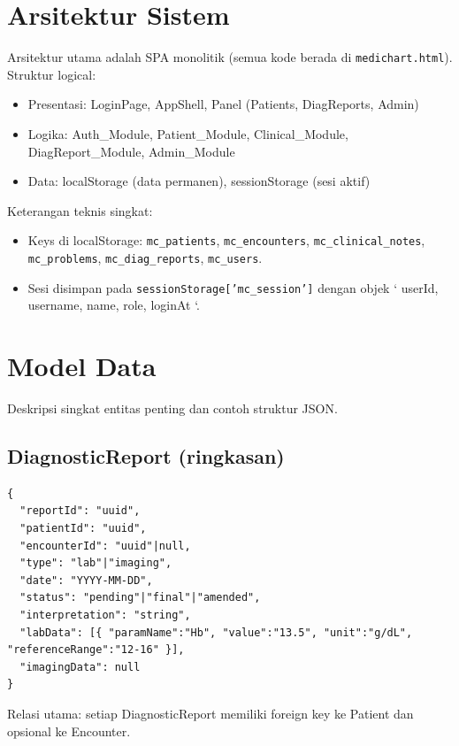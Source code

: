 \documentclass[12pt,a4paper]{article}
\begin{document}
\section{Arsitektur Sistem}
Arsitektur utama adalah SPA monolitik (semua kode berada di \texttt{medichart.html}). Struktur logical:
\begin{itemize}[leftmargin=1.2cm]
  \item Presentasi: LoginPage, AppShell, Panel (Patients, DiagReports, Admin)
  \item Logika: Auth\_Module, Patient\_Module, Clinical\_Module, DiagReport\_Module, Admin\_Module
  \item Data: localStorage (data permanen), sessionStorage (sesi aktif)
\end{itemize}

Keterangan teknis singkat:
\begin{itemize}[leftmargin=1.2cm]
  \item Keys di localStorage: \texttt{mc_patients}, \texttt{mc_encounters}, \texttt{mc_clinical_notes}, \texttt{mc_problems}, \texttt{mc_diag_reports}, \texttt{mc_users}.
  \item Sesi disimpan pada \texttt{sessionStorage['mc_session']} dengan objek `{ userId, username, name, role, loginAt }`.
\end{itemize}

\section{Model Data}
Deskripsi singkat entitas penting dan contoh struktur JSON.
\subsection*{DiagnosticReport (ringkasan)}
\begin{verbatim}
{
  "reportId": "uuid",
  "patientId": "uuid",
  "encounterId": "uuid"|null,
  "type": "lab"|"imaging",
  "date": "YYYY-MM-DD",
  "status": "pending"|"final"|"amended",
  "interpretation": "string",
  "labData": [{ "paramName":"Hb", "value":"13.5", "unit":"g/dL", "referenceRange":"12-16" }],
  "imagingData": null
}
\end{verbatim}

Relasi utama: setiap DiagnosticReport memiliki foreign key ke Patient dan opsional ke Encounter.
\end{document}
